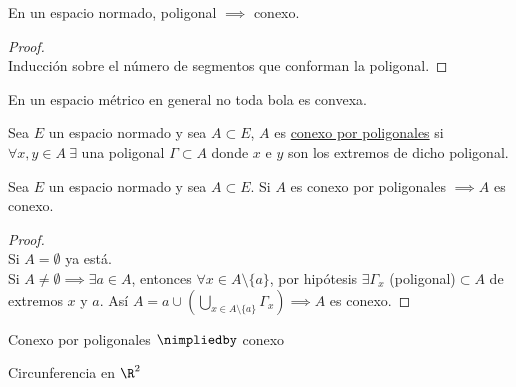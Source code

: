  	\begin{proposicion} En un espacio normado, poligonal $\implies$ conexo.
 	\begin{proof}\ \\
 		Inducción sobre el número de segmentos que conforman la poligonal.
 	\end{proof}
 	\end{proposicion}
 	
 	\begin{observacion} En un espacio métrico en general no toda bola es convexa.
 	\end{observacion}
 	
 	\begin{defi}Sea $E$ un espacio normado y sea $A\subset E$, $A$ es \underline{conexo por poligonales} si $\forall x,y\in A\ \exists$ una poligonal $\Gamma\subset A$ donde $x$ e $y$ son los extremos de dicho poligonal.
 	\end{defi}
 	
 	\begin{proposicion} Sea $E$ un espacio normado y sea $A\subset E$. Si $A$ es conexo por poligonales $\implies A$ es conexo.
 	\begin{proof}\ \\
 	Si $A=\emptyset$ ya está.\\
 	Si $A\neq\emptyset\implies\exists a\in A$, entonces $\forall x\in A\setminus \{a\}$, por hipótesis $\exists \Gamma_x$ (poligonal)$\subset A$ de extremos $x$ y $a$. Así $A={a}\cup\left(\bigcup_{x\in A\setminus \{a\}} \Gamma_x \right) \implies A$ es conexo.
 	\end{proof}
 	\end{proposicion}

	\begin{observacion} Conexo por poligonales $\nimpliedby$ conexo
		\begin{ejem} Circunferencia en $\R^2$
		\end{ejem}
	\end{observacion}
	
